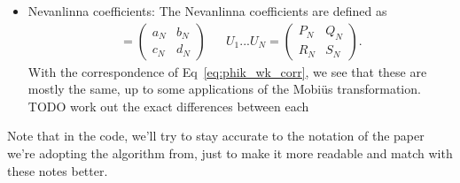\begin{itemize}
    \item Nevanlinna coefficients: The Nevanlinna coefficients are defined as
    \begin{align}
        [\Theta_N] = \begin{pmatrix}
            a_N & b_N \\ c_N & d_N
        \end{pmatrix}
        &&
        U_1 ... U_N = \begin{pmatrix}
            P_N & Q_N \\ R_N & S_N
        \end{pmatrix}.
    \end{align}
    With the correspondence of Eq~\eqref{eq:phik_wk_corr}, we see that these are mostly the same, up to some applications of the Mobi\"us transformation. {\color{red}TODO work out the exact differences between each}
\end{itemize}
Note that in the code, we'll try to stay accurate to the notation of the paper we're adopting the algorithm from, just to make it more readable and match with these notes better. 





